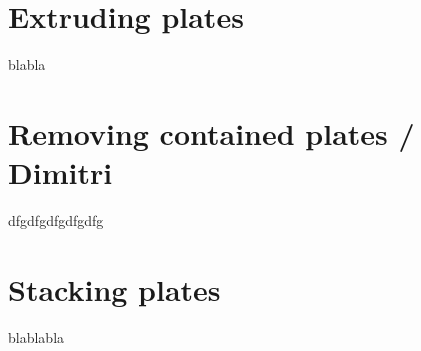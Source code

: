 \documentclass[../ClassicThesis.tex]{subfiles}
\begin{document}
\section{Extruding plates}

blabla

\section{Removing contained plates / Dimitri}

dfgdfgdfgdfgdfg

\section{Stacking plates}

blablabla


\end{document}
